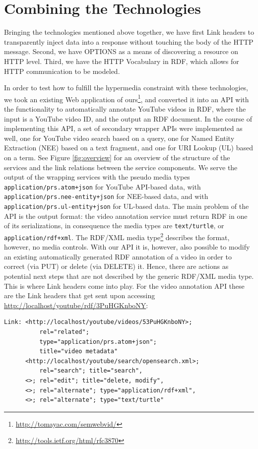 \documentclass{acm_proc_article-sp}
\begin{document}
\section{Combining the Technologies}\label{sec:implementation}
Bringing the technologies mentioned above together, we have first Link headers to transparently inject data into a response without touching the body of the HTTP message. Second, we have OPTIONS as a means of discovering a resource on HTTP level. Third, we have the HTTP Vocabulary in RDF, which allows for HTTP communication to be modeled.

In order to test how to fulfill the hypermedia constraint with these technologies, we took an existing Web application of ours\footnote{\url{http://tomayac.com/semwebvid/}}, and converted it into an API with the functionality to automatically annotate YouTube videos in RDF, where the input is a YouTube video ID, and the output an RDF document. In the course of implementing this API, a set of secondary wrapper APIs were implemented as well, one for YouTube video search based on a query, one for Named Entity Extraction (NEE) based on a text fragment, and one for URI Lookup (UL) based on a term. See Figure \ref{fig:overview} for an overview of the structure of the services and the link relations between the service components. We serve the output of the wrapping services with the pseudo media types \texttt{application/prs.atom+json} for YouTube API-based data, with \texttt{application/prs.nee-entity+json} for NEE-based data, and with \texttt{application/prs.ul-entity+json} for UL-based data. The main problem of the API is the output format: the video annotation service must return RDF in one of its serializations, in consequence the media types are \texttt{text/turtle}, or \texttt{application/rdf+xml}. The RDF/XML media type\footnote{\url{http://tools.ietf.org/html/rfc3870}} describes the format, however, no media controls. With our API it is, however, also possible to modify an existing automatically generated RDF annotation of a video in order to correct (via PUT) or delete (via DELETE) it. Hence, there are actions as potential next steps that are not described by the generic RDF/XML media type. This is where Link headers come into play. For the video annotation API these are the Link headers that get sent upon accessing \url{http://localhost/youtube/rdf/3PuHGKnboNY}:
\begin{lstlisting}
Link: <http://localhost/youtube/videos/53PuHGKnboNY>;
          rel="related";
          type="application/prs.atom+json";
          title="video metadata"
      <http://localhost/youtube/search/opensearch.xml>;
          rel="search"; title="search",
      <>; rel="edit"; title="delete, modify",
      <>; rel="alternate"; type="application/rdf+xml",
      <>; rel="alternate"; type="text/turtle"   
\end{lstlisting}
\end{document}
